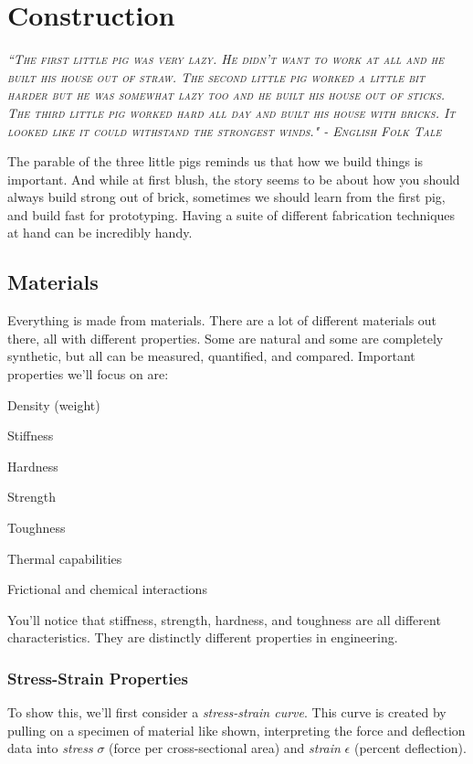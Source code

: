 
\chapter{Construction}
 
 {\slshape \scshape ``The first little pig was very lazy. He didn't want to work at all and he built his house out of straw. The second little pig worked a little bit harder but he was somewhat lazy too and he built his house out of sticks. The third little pig worked hard all day and built his house with bricks. It looked like it could withstand the strongest winds." - English Folk Tale}
 
 The parable of the three little pigs reminds us that how we build things is important. And while at first blush, the story seems to be about how you should always build strong out of brick, sometimes we should learn from the first pig, and build fast for prototyping. Having a suite of different fabrication techniques at hand can be incredibly handy.
 
 \section{Materials}
 
 Everything is made from materials. There are a lot of different materials out there, all with different properties. Some are natural and some are completely synthetic, but all can be measured, quantified, and compared. Important properties we'll focus on are:
 
 \begin{compactitem}
 	\item Density (weight)
 	\item Stiffness
 	\item Hardness
 	\item Strength
 	\item Toughness
 	\item Thermal capabilities
 	\item Frictional and chemical interactions
 \end{compactitem}
 
 You'll notice that stiffness, strength, hardness, and toughness are all different characteristics. They are distinctly different properties in engineering.
 
 \subsection{Stress-Strain Properties}
 To show this, we'll first consider a \textit{stress-strain curve}. This curve is created by pulling on a specimen of material like shown, interpreting the force and deflection data into \textit{stress} $\sigma$ (force per cross-sectional area) and \textit{strain} $\epsilon$ (percent deflection).
 
